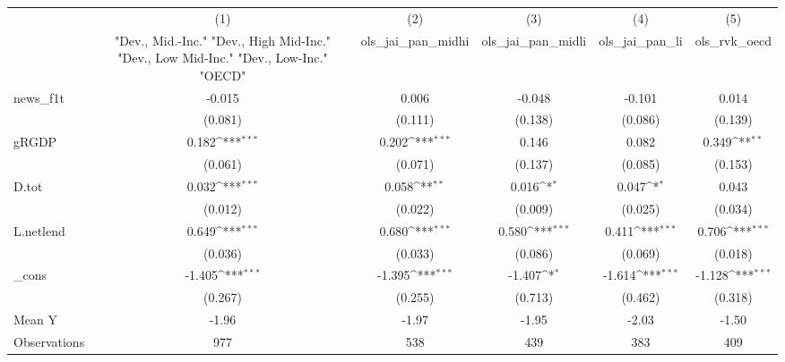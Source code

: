 {
\def\sym#1{\ifmmode^{#1}\else\(^{#1}\)\fi}
\begin{tabular}{l*{5}{c}}
\toprule
            &\multicolumn{1}{c}{(1)}&\multicolumn{1}{c}{(2)}&\multicolumn{1}{c}{(3)}&\multicolumn{1}{c}{(4)}&\multicolumn{1}{c}{(5)}\\
            &\multicolumn{1}{c}{ "Dev., Mid.-Inc." "Dev., High Mid-Inc." "Dev., Low Mid-Inc." "Dev., Low-Inc." "OECD" }&\multicolumn{1}{c}{ols\_jai\_pan\_midhi}&\multicolumn{1}{c}{ols\_jai\_pan\_midli}&\multicolumn{1}{c}{ols\_jai\_pan\_li}&\multicolumn{1}{c}{ols\_rvk\_oecd}\\
\midrule
news\_f1t    &      -0.015         &       0.006         &      -0.048         &      -0.101         &       0.014         \\
            &     (0.081)         &     (0.111)         &     (0.138)         &     (0.086)         &     (0.139)         \\
\addlinespace
gRGDP       &       0.182\sym{***}&       0.202\sym{***}&       0.146         &       0.082         &       0.349\sym{**} \\
            &     (0.061)         &     (0.071)         &     (0.137)         &     (0.085)         &     (0.153)         \\
\addlinespace
D.tot       &       0.032\sym{***}&       0.058\sym{**} &       0.016\sym{*}  &       0.047\sym{*}  &       0.043         \\
            &     (0.012)         &     (0.022)         &     (0.009)         &     (0.025)         &     (0.034)         \\
\addlinespace
L.netlend   &       0.649\sym{***}&       0.680\sym{***}&       0.580\sym{***}&       0.411\sym{***}&       0.706\sym{***}\\
            &     (0.036)         &     (0.033)         &     (0.086)         &     (0.069)         &     (0.018)         \\
\addlinespace
\_cons      &      -1.405\sym{***}&      -1.395\sym{***}&      -1.407\sym{*}  &      -1.614\sym{***}&      -1.128\sym{***}\\
            &     (0.267)         &     (0.255)         &     (0.713)         &     (0.462)         &     (0.318)         \\
\midrule
Mean Y      &       -1.96         &       -1.97         &       -1.95         &       -2.03         &       -1.50         \\
Observations&         977         &         538         &         439         &         383         &         409         \\
\bottomrule
\end{tabular}
}

